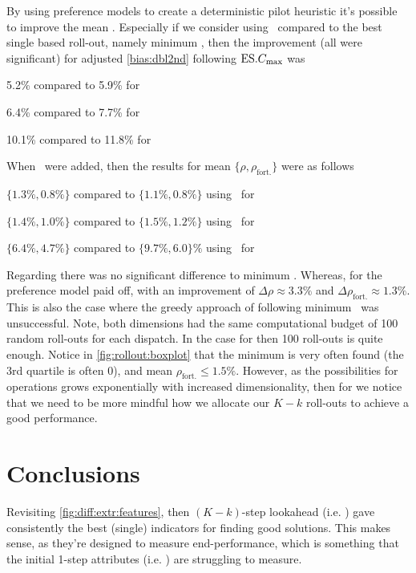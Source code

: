 By using preference models to create a deterministic pilot heuristic it's 
possible to improve the mean \namerho. Especially if we consider using 
\phiSDRRelated\ compared to the best single based roll-out, namely minimum 
\phiSPT, then the improvement (all were significant) for adjusted 
\ref{bias:dbl2nd} following $\text{ES}.{C_{\max}}$ was 
\begin{enumerate*}
    \item 5.2\% compared to 5.9\% for 
    \item 6.4\% compared to 7.7\% for  
    \item 10.1\% compared to 11.8\% for  
\end{enumerate*}
When \phiRNDRelated\ were added, then the results for mean 
$\{\rho,\rho_{\text{fort.}}\}$ were as follows
\begin{enumerate*}
    \item $\{1.3\%,0.8\%\}$ compared to $\{1.1\%,0.8\%\}$ using 
    \phiRNDmin\ for  
    \item $\{1.4\%,1.0\%\}$ compared to $\{1.5\%,1.2\%\}$ using 
    \phiRNDmin\ for  
    \item $\{6.4\%,4.7\%\}$ compared to $\{9.7\%,6.0\}\%$ using 
    \phiRNDmean\ for  
\end{enumerate*}
Regarding \Problem[6\times5]{\train} there was no significant difference to 
minimum
\phiRNDmin. 
Whereas, for  the preference model paid off, with an improvement 
of $\Delta\rho\approx3.3\%$ and $\Delta\rho_{\text{fort.}}\approx1.3\%$.
This is also the case where the greedy approach of following minimum 
\phiRNDmin\ was unsuccessful. Note, both dimensions had the same computational 
budget of 100 random roll-outs for each dispatch. 
In the case for \Problem[6\times5]{\train} then 100 roll-outs is quite enough. 
Notice in \cref{fig:rollout:boxplot} that the minimum is very often found (the 
3rd quartile is often 0), and mean $\rho_{\text{fort.}}\leq1.5\%$.
However, as the possibilities for operations grows exponentially with increased 
dimensionality, then for  we notice that we need to be more 
mindful how we allocate our $K-k$ roll-outs to achieve a good performance.

\section{Conclusions}

Revisiting \cref{fig:diff:extr:features}, then $(K-k)$-step lookahead (i.e. 
\phiGlobalRelated) gave consistently the best (single) indicators for finding 
good solutions. 
This makes sense, as they're designed to measure end-performance, which is 
something that the initial 1-step attributes (i.e. \phiLocalRelated) are 
struggling to measure.

